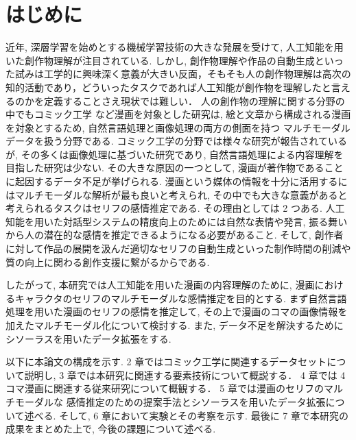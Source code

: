\newpage
\changeindent{0cm}
\section{はじめに}
\changeindent{2cm}
近年, 深層学習を始めとする機械学習技術の大きな発展を受けて, 人工知能を用いた創作物理解が注目されている.
しかし, 創作物理解や作品の自動生成といった試みは工学的に興味深く意義が大きい反面，そもそも人の創作物理解は高次の知的活動であり，どういったタスクであれば人工知能が創作物を理解したと言えるのかを定義することさえ現状では難しい．
人の創作物の理解に関する分野の中でもコミック工学 \cite{comic} など漫画を対象とした研究は,
絵と文章から構成される漫画を対象とするため, 自然言語処理と画像処理の両方の側面を持つ
マルチモーダルデータを扱う分野である.
コミック工学の分野では様々な研究が報告されているが,
その多くは画像処理に基づいた研究であり,
自然言語処理による内容理解を目指した研究は少ない.
その大きな原因の一つとして, 漫画が著作物であることに起因するデータ不足が挙げられる.
漫画という媒体の情報を十分に活用するにはマルチモーダルな解析が最も良いと考えられ, その中でも大きな意義があると考えられるタスクはセリフの感情推定である. その理由としては 2 つある. 人工知能を用いた対話型システムの精度向上のためには自然な表情や発言, 振る舞いから人の潜在的な感情を推定できるようになる必要があること. そして, 創作者に対して作品の展開を汲んだ適切なセリフの自動生成といった制作時間の削減や質の向上に関わる創作支援に繋がるからである.

したがって, 本研究では人工知能を用いた漫画の内容理解のために,
漫画におけるキャラクタのセリフのマルチモーダルな感情推定を目的とする.
まず自然言語処理を用いた漫画のセリフの感情を推定して,
その上で漫画のコマの画像情報を加えたマルチモーダル化について検討する. また, データ不足を解決するために
シソーラスを用いたデータ拡張をする.

以下に本論文の構成を示す.
2 章ではコミック工学に関連するデータセットについて説明し,
3 章では本研究に関連する要素技術について概説する．
4 章では 4 コマ漫画に関連する従来研究について概観する．
5 章では漫画のセリフのマルチモーダルな
感情推定のための提案手法とシソーラスを用いたデータ拡張について述べる.
そして, 6 章において実験とその考察を示す.
最後に 7 章で本研究の成果をまとめた上で, 今後の課題について述べる.

